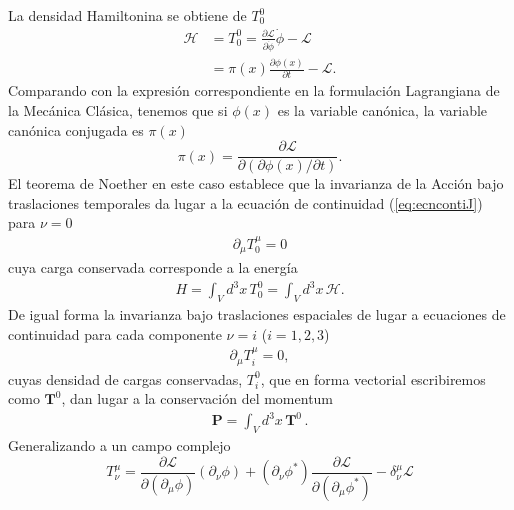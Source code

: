 \begin{frame}
La densidad Hamiltonina se obtiene de $T^0_0$
\begin{align}
  \label{eq:3}
\mathcal{H}&=T^0_0=\frac{\partial\mathcal{L}}{\partial\dot{\phi}}\dot{\phi}
      -\mathcal{L}\\
      &=\pi(x)\frac{\partial\phi(x)}{\partial t}-\mathcal{L}.
\end{align}
Comparando con la expresi\'on correspondiente en la formulaci\'on
Lagrangiana de la Mec\'anica Cl\'asica, tenemos que si $\phi(x)$ es la
variable can\'onica, la variable can\'onica conjugada es $\pi(x)$
\begin{equation}
  \label{eq:4}
  \pi(x)=\frac{\partial\mathcal{L}}{\partial(\partial\phi(x)/\partial t)}.
\end{equation}
El teorema de Noether en este caso establece que la invarianza de la Acci\'on bajo traslaciones temporales da lugar a la ecuación de continuidad (\ref{eq:ecncontiJ}) para $\nu=0$
\begin{align}
\label{eq:122}
  \partial_\mu T^\mu_0=0
\end{align}
cuya carga conservada corresponde a la energía
\begin{align}
  H=\int_V d^3x\, T^0_0=\int_V d^3x\,\mathcal{H}.
\end{align}
De igual forma la invarianza bajo traslaciones espaciales de lugar a ecuaciones de continuidad para cada componente $\nu=i$
 ($i=1,2,3$)
 \begin{align}
   \label{eq:235}
   \partial_\mu T^\mu_i=0,
 \end{align}
cuyas densidad de cargas conservadas, $T^0_i$, que en forma vectorial escribiremos como $\mathbf{T}^0$, dan lugar a la conservaci\'on del momentum
\begin{align}
  \mathbf{P}=\int_V d^3x\,\mathbf{T}^0\,.
\end{align}
Generalizando a un campo complejo
\begin{equation}
  \label{eq:138}
     T^\mu_\nu=\frac{\partial\mathcal{L}}{\partial(\partial_\mu\phi)}(\partial_\nu\phi)+(\partial_\nu\phi^*)\frac{\partial\mathcal{L}}{\partial(\partial_\mu\phi^*)}
      -\delta^\mu_\nu\mathcal{L}
\end{equation}

\end{frame}




